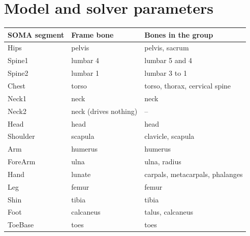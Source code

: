 \documentclass[11pt]{article}
\begin{document}
\section{Model and solver parameters}
\label{app:parameters}
\begin{center}\small
{}
\begin{tabular}{@{}lll@{}}
\toprule
SOMA segment & Frame bone & Bones in the group \\
\midrule
Hips & pelvis & pelvis, sacrum \\
Spine1 & lumbar 4 & lumbar 5 and 4 \\
Spine2 & lumbar 1 & lumbar 3 to 1 \\
Chest & torso & torso, thorax, cervical spine \\
Neck1 & neck & neck \\
Neck2 & neck (drives nothing) & -- \\
Head & head & head \\
Shoulder & scapula & clavicle, scapula \\
Arm & humerus & humerus \\
ForeArm & ulna & ulna, radius \\
Hand & lunate & carpals, metacarpals, phalanges \\
Leg & femur & femur \\
Shin & tibia & tibia \\
Foot & calcaneus & talus, calcaneus \\
ToeBase & toes & toes \\
\bottomrule
\end{tabular}
\end{center}
\end{document}
